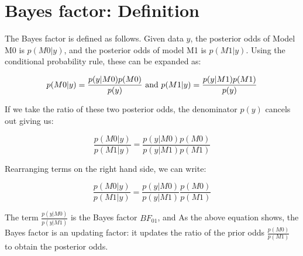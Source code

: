 \documentclass[12pt,]{krantz}
\theoremstyle{definition}
\theoremstyle{definition}
\theoremstyle{definition}
\theoremstyle{remark}
\begin{document}
\mainmatter

\hypertarget{bayes-factor-definition}{%
\chapter{Bayes factor: Definition}\label{bayes-factor-definition}}

The Bayes factor is defined as follows. Given data \(y\), the
posterior odds of Model M0 is \(p(M0|y)\), and the posterior odds of model M1 is \(p(M1|y)\). Using the conditional probability rule, these can be expanded as:

\begin{equation}
p(M0|y) = \frac{p(y|M0) p(M0)}{p(y)}  \hbox{ and } p(M1|y) = \frac{p(y|M1) p(M1)}{p(y)}
\end{equation}

If we take the ratio of these two posterior odds, the denominator \(p(y)\) cancels out giving us:

\begin{equation}
\frac{p(M0|y)}{p(M1|y)}=\frac{p(y|M0) p(M0)}{p(y|M1) p(M1)} 
\end{equation}

Rearranging terms on the right hand side, we can write:

\begin{equation}
\frac{p(M0|y)}{p(M1|y)}=\frac{p(y|M0)}{p(y|M1)} \frac{p(M0)}{p(M1)} 
\end{equation}

The term \(\frac{p(y|M0)}{p(y|M1)}\) is the Bayes factor \(BF_{01}\), and
As the above equation shows, the Bayes factor is an updating factor: it updates the ratio of the prior odds \(\frac{p(M0)}{p(M1)}\) to obtain the posterior odds.



\backmatter
\printindex
\end{document}
